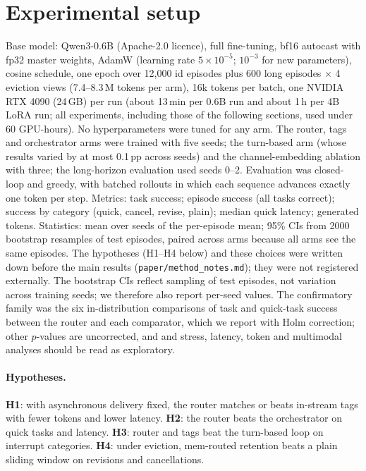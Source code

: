 \documentclass[10pt]{article}
\begin{document}
\section{Experimental setup}\label{sec:setup}
Base model: Qwen3-0.6B \citep{yang2025qwen3} (Apache-2.0 licence), full fine-tuning, bf16 autocast with fp32 master weights, AdamW (learning rate $5\times10^{-5}$; $10^{-3}$ for new parameters), cosine schedule, one epoch over 12{,}000 id episodes plus 600 long episodes $\times$ 4 eviction views (7.4--8.3\,M tokens per arm), 16k tokens per batch, one NVIDIA RTX 4090 (24\,GB) per run (about 13\,min per 0.6B run and about 1\,h per 4B LoRA run; all experiments, including those of the following sections, used under 60 GPU-hours). No hyperparameters were tuned for any arm. The router, tags and orchestrator arms were trained with five seeds; the turn-based arm (whose results varied by at most 0.1\,pp across seeds) and the channel-embedding ablation with three; the long-horizon evaluation used seeds 0--2. Evaluation was closed-loop and greedy, with batched rollouts in which each sequence advances exactly one token per step. Metrics: task success; episode success (all tasks correct); success by category (quick, cancel, revise, plain); median quick latency; generated tokens. Statistics: mean over seeds of the per-episode mean; 95\% CIs from 2000 bootstrap resamples of test episodes, paired across arms because all arms see the same episodes. The hypotheses (H1--H4 below) and these choices were written down before the main results (\texttt{paper/method\_notes.md}); they were not registered externally. The bootstrap CIs reflect sampling of test episodes, not variation across training seeds; we therefore also report per-seed values. The confirmatory family was the six in-distribution comparisons of task and quick-task success between the router and each comparator, which we report with Holm correction; other $p$-values are uncorrected, and and stress, latency, token and multimodal analyses should be read as exploratory.

\paragraph{Hypotheses.} \textbf{H1}: with asynchronous delivery fixed, the router matches or beats in-stream tags with fewer tokens and lower latency. \textbf{H2}: the router beats the orchestrator on quick tasks and latency. \textbf{H3}: router and tags beat the turn-based loop on interrupt categories. \textbf{H4}: under eviction, mem-routed retention beats a plain sliding window on revisions and cancellations.
\end{document}
